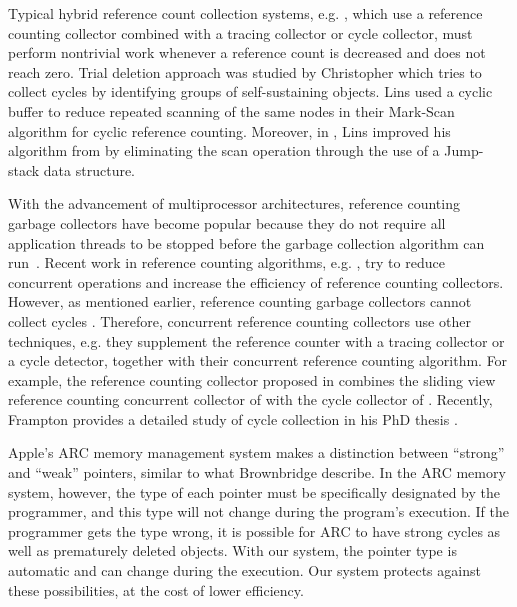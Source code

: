 Typical hybrid reference count collection systems, e.g. \cite{Bacon2001,Levanoni2006,Bacon:2001:JWC,Barabash2005,Lins2008}, which use a reference counting collector combined with a tracing collector or cycle collector,
must perform nontrivial work whenever a reference count is decreased and does
not reach zero. Trial deletion approach was studied by Christopher \cite{Christopher1984} which tries to collect cycles by identifying groups of self-sustaining objects. 
Lins \cite{Lins:1992:CRC} used a cyclic buffer to reduce repeated scanning of the same nodes in their Mark-Scan algorithm for cyclic reference counting. Moreover, in \cite{Lins:2002:EAC}, Lins improved his algorithm  from \cite{Lins:1992:CRC} by eliminating the scan operation through the use of a Jump-stack data structure.

With the advancement of multiprocessor architectures,
reference counting garbage collectors have become popular because
they do not require all application threads to be stopped before the garbage collection algorithm can run~\cite{Levanoni2006}.
Recent work in reference counting algorithms, e.g. \cite{Barabash2005,Levanoni2006,Bacon2001,Bacon:2001:JWC}, try to
reduce concurrent operations and increase the efficiency of reference counting collectors.
However, as mentioned earlier, reference counting garbage collectors cannot collect cycles \cite{McBeth1963}. Therefore, concurrent reference counting collectors \cite{Barabash2005,Levanoni2006,Bacon2001,Bacon:2001:JWC,Paz2007,Lins2008} use other techniques, e.g. they supplement the reference counter with a tracing collector or a cycle detector, together with their concurrent reference counting algorithm. For example, the reference counting collector proposed in \cite{Paz2007} combines the sliding view reference counting concurrent collector of \cite{Levanoni2006} with the cycle collector of \cite{Bacon2001}. Recently, Frampton provides a detailed study of cycle collection in his PhD thesis \cite{Frampton2010}.


Apple's ARC memory management system makes a distinction between ``strong'' and ``weak'' pointers, similar to what Brownbridge describe. In the ARC memory system, however, the type of each pointer must be specifically designated by the programmer, and this type will not change during the program's execution. If the programmer gets the type wrong, it is possible for ARC to have strong cycles as well as prematurely deleted objects. With our system, the pointer type is automatic and can change during the execution. Our system protects against these possibilities, at the cost of lower efficiency.


